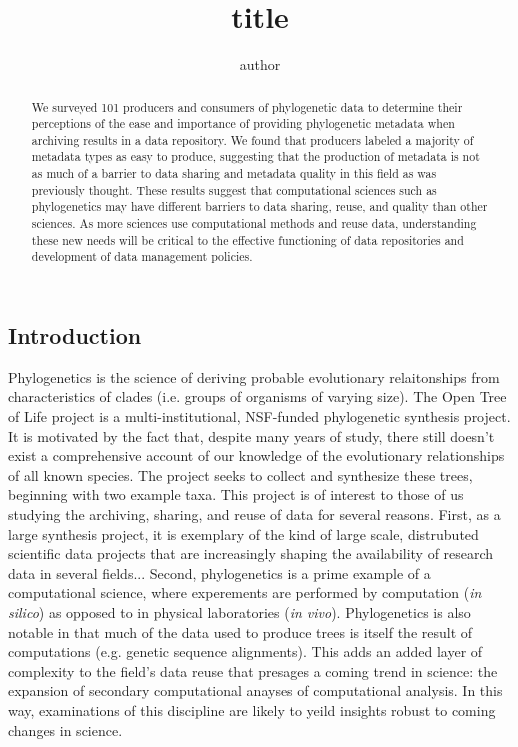 \documentclass[12pt]{scrartcl}
\title{title}
\author{author}
\begin{document}
%
%

\maketitle
\thispagestyle{fancy}

\begin{multicols}{2}

\begin{abstract}
We surveyed 101 producers and consumers of phylogenetic data to determine their perceptions of the ease and importance of providing phylogenetic metadata when archiving results in a data repository.  We found that producers labeled a majority of metadata types as easy to produce, suggesting that the production of metadata is not as much of a barrier to data sharing and metadata quality in this field as was previously thought.  
These results suggest that computational sciences such as phylogenetics may have different barriers to data sharing, reuse, and quality than other sciences.  As more sciences use computational methods and reuse data, understanding these new needs will be critical to the effective functioning of data repositories and development of data management policies.
\end{abstract}


\section{Introduction}
Phylogenetics is the science of deriving probable evolutionary relaitonships from characteristics of clades (i.e. groups of organisms of varying size).  
The Open Tree of Life project %
is a multi-institutional, NSF-funded phylogenetic synthesis project.  It is motivated by the fact that, despite many years of study, there still doesn't exist a comprehensive account of our knowledge of the evolutionary relationships of all known species.  The project seeks to collect and synthesize these trees, beginning with two example taxa.
This project is of interest to those of us studying the archiving, sharing, and reuse of data for several reasons.  First, as a large synthesis project, it is exemplary of the kind of large scale, distrubuted scientific data projects that are increasingly shaping the availability of research data in several fields... %
Second, phylogenetics is a prime example of a computational science, where experements are performed by computation (\textit{in silico}) as opposed to in physical laboratories (\textit{in vivo}).  Phylogenetics is also notable in that much of the data used to produce trees is itself the result of computations (e.g. genetic sequence alignments).  This adds an added layer of complexity to the field's data reuse that presages a coming trend in science: the expansion of secondary computational anayses of computational analysis.  In this way, examinations of this discipline are likely to yeild insights robust to coming changes in science.



\end{multicols}
\end{document}
